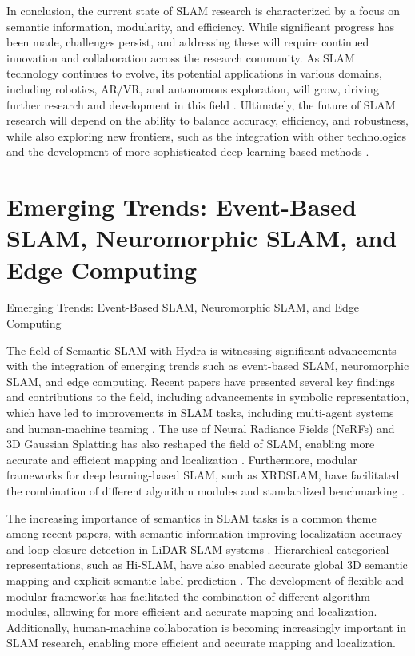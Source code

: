 \documentclass[conference]{IEEEtran}
\begin{document}
In conclusion, the current state of SLAM research is characterized by a focus on semantic information, modularity, and efficiency. While significant progress has been made, challenges persist, and addressing these will require continued innovation and collaboration across the research community. As SLAM technology continues to evolve, its potential applications in various domains, including robotics, AR/VR, and autonomous exploration, will grow, driving further research and development in this field \cite{b8}. Ultimately, the future of SLAM research will depend on the ability to balance accuracy, efficiency, and robustness, while also exploring new frontiers, such as the integration with other technologies and the development of more sophisticated deep learning-based methods \cite{b9}.

\section{Emerging Trends: Event-Based SLAM, Neuromorphic SLAM, and Edge Computing}
Emerging Trends: Event-Based SLAM, Neuromorphic SLAM, and Edge Computing

The field of Semantic SLAM with Hydra is witnessing significant advancements with the integration of emerging trends such as event-based SLAM, neuromorphic SLAM, and edge computing. Recent papers have presented several key findings and contributions to the field, including advancements in symbolic representation, which have led to improvements in SLAM tasks, including multi-agent systems and human-machine teaming \cite{b1}. The use of Neural Radiance Fields (NeRFs) and 3D Gaussian Splatting has also reshaped the field of SLAM, enabling more accurate and efficient mapping and localization \cite{b2}. Furthermore, modular frameworks for deep learning-based SLAM, such as XRDSLAM, have facilitated the combination of different algorithm modules and standardized benchmarking \cite{b3}.

The increasing importance of semantics in SLAM tasks is a common theme among recent papers, with semantic information improving localization accuracy and loop closure detection in LiDAR SLAM systems \cite{b4}. Hierarchical categorical representations, such as Hi-SLAM, have also enabled accurate global 3D semantic mapping and explicit semantic label prediction \cite{b5}. The development of flexible and modular frameworks has facilitated the combination of different algorithm modules, allowing for more efficient and accurate mapping and localization. Additionally, human-machine collaboration is becoming increasingly important in SLAM research, enabling more efficient and accurate mapping and localization.
\end{document}
